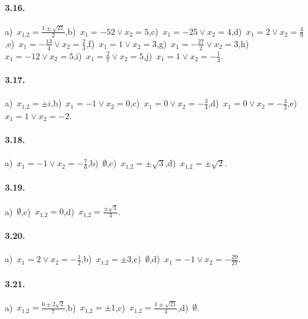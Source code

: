 
\paragraph{3.16.} a)~$x_{1\text{,}2} = \frac{1\pm\sqrt{21}}{2}$,\quad b)~$x_{1} =-52 \vee x_{2} = 5$,\quad c)~$x_{1} =-25 \vee x_{2} = 4$,\quad d)~$x_{1} =2 \vee x_{2} = \frac{4}{9}$,\quad e)~$x_{1} =-\frac{13}{4} \vee x_{2} = \frac{2}{3}$,\quad f)~$x_{1} =1\vee x_{2} = 3$,\quad g)~$x_{1} =-\frac{27}{2} \vee x_{2} = 3$,\quad h)~$x_{1} =-12 \vee x_{2} = 5$,\quad i)~$x_{1} =\frac{2}{7} \vee x_{2} = 5$,\quad j)~$x_{1} =1 \vee x_{2} =-\frac{1}{3}$.

\paragraph{3.17.} a)~$x_{1\text{,}2} = \pm{i}$,\quad b)~$x_{1} =-1 \vee x_{2} =0$,\quad c)~$x_{1} =0 \vee x_{2} =- \frac{3}{4}$,\quad d)~$x_{1} =0 \vee x_{2} =- \frac{3}{2}$,\quad e)~$x_{1} =1 \vee x_{2} =-2$.

\paragraph{3.18.} a)~$x_{1} =-1 \vee x_{2} =-\frac{7}{6}$,\quad b)~$\emptyset$,\quad c)~$x_{1\text{,}2} = \pm \sqrt{3}$,\quad d)~$x_{1\text{,}2} =\pm \sqrt{2}$.

\paragraph{3.19.} a)~$\emptyset$,\quad c)~$x_{1\text{,}2}= 0$,\quad d)~$x_{1\text{,}2} = \frac{\pm \sqrt{3}}{3}$.

\paragraph{3.20.} a)~$x_{1} = 2 \vee x_{2} =-\frac{1}{2}$,\quad b)~$x_{1\text{,}2} =\pm 3$,\quad c)~$\emptyset$,\quad d)~$x_{1} =-1 \vee x_{2} =-\frac{29}{27}$.

\paragraph{3.21.} a)~$x_{1\text{,}2} = \frac{6 \pm 2 \sqrt{2}}{7}$,\quad b)~$x_{1\text{,}2} =\pm 1$,\quad c)~$x_{1\text{,}2} = \frac{1 \pm \sqrt{21}}{4}$,\quad d)~$\emptyset$.

